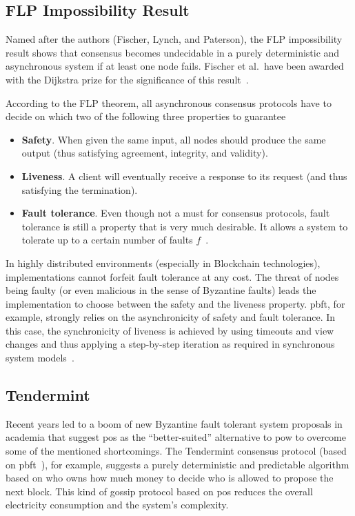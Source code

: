 \subsection{FLP Impossibility Result}
\label{sec:background:flp}
Named after the authors (Fischer, Lynch, and Paterson), the FLP impossibility result shows that consensus becomes undecidable in a purely deterministic and asynchronous system if at least one node fails. Fischer et al.\ have been awarded with the Dijkstra prize for the significance of this result~\cite{impossibility_result_1985}.

According to the FLP theorem, all asynchronous consensus protocols have to decide on which two of the following three properties to guarantee~\cite{consensus_comparison_2019}

\begin{itemize}
\item \textbf{Safety}. When given the same input, all nodes should produce the same output (thus satisfying agreement, integrity, and validity).
\item \textbf{Liveness}. A client will eventually receive a response to its request (and thus satisfying the termination).
\item \textbf{Fault tolerance}. Even though not a must for consensus protocols, fault tolerance is still a property that is very much desirable. It allows a system to tolerate up to a certain number of faults $f$~\cite{liskov1999,tendermint2018,bessani14state_machin_replic_masses_bft_smart}.
\end{itemize}

In highly distributed environments (especially in Blockchain technologies), implementations cannot forfeit fault tolerance at any cost. The threat of nodes being faulty (or even malicious in the sense of Byzantine faults) leads the implementation to choose between the safety and the liveness property. \gls{pbft}, for example, strongly relies on the asynchronicity of safety and fault tolerance. In this case, the synchronicity of liveness is achieved by using timeouts and view changes and thus applying a step-by-step iteration as required in synchronous system models~\cite{liskov1999}.


\subsection{Tendermint}
Recent years led to a boom of new Byzantine fault tolerant system proposals in academia that suggest \gls{pos} as the ``better-suited'' alternative to \gls{pow} to overcome some of the mentioned shortcomings. The Tendermint consensus protocol (based on \gls{pbft}~\cite{liskov1999}), for example, suggests a purely deterministic and predictable algorithm based on who owns how much money to decide who is allowed to propose the next block. This kind of gossip protocol based on \gls{pos} reduces the overall electricity consumption and the system's complexity.


